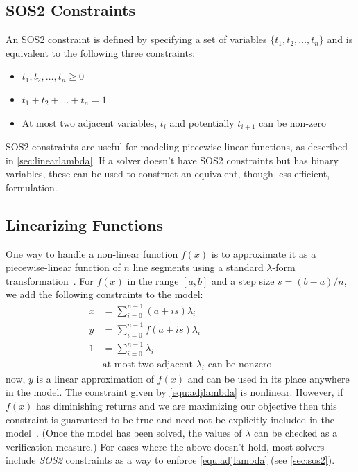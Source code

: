\documentclass{article}
\begin{document}
\subsection{SOS2 Constraints}
\label{sec:sos2}

An SOS2 constraint is defined by specifying a set of variables $\{t_1,t_2,\ldots,t_n\}$ and is equivalent to the following three constraints:
\begin{itemize}
\item $t_1,t_2,\ldots,t_n\ge0$
\item $t_1+t_2+\ldots+t_n=1$
\item At most two adjacent variables, $t_i$ and potentially $t_{i+1}$ can be non-zero
\end{itemize}
SOS2 constraints are useful for modeling piecewise-linear functions, as described in \autoref{sec:linearlambda}. If a solver doesn't have SOS2 constraints but has binary variables, these can be used to construct an equivalent, though less efficient, formulation.



\subsection{Linearizing Functions}
\label{sec:linearlambda}


One way to handle a non-linear function $f(x)$ is to approximate it as a piecewise-linear function of $n$ line segments using a standard $\lambda$-form transformation~\citep{Williams2013}. For $f(x)$ in the range $[a,b]$ and a step size $s=(b-a)/n$, we add the following constraints to the model: %
\begin{align}
x &= \sum_{i=0}^{n-1}  (a+is) \lambda_{i} \\
y &= \sum_{i=0}^{n-1} f(a+is) \lambda_{i} \\
1 &= \sum_{i=0}^{n-1}         \lambda_{i} \\
&\textrm{at most two adjacent $\lambda_{i}$ can be nonzero} \label{equ:adjlambda}
\end{align}
now, $y$ is a linear approximation of $f(x)$ and can be used in its place anywhere in the model. The constraint given by \autoref{equ:adjlambda} is nonlinear. However, if $f(x)$ has diminishing returns and we are maximizing our objective then this constraint is guaranteed to be true and need not be explicitly included in the model~\citep{Williams2013}. (Once the model has been solved, the values of $\lambda$ can be checked as a verification measure.) For cases where the above doesn't hold, most solvers include \textit{SOS2} constraints as a way to enforce \autoref{equ:adjlambda} (see \autoref{sec:sos2}).
\end{document}
